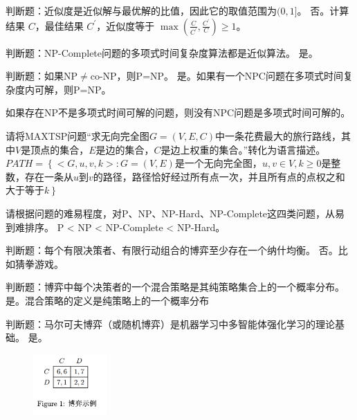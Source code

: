 \begin{problem}
	判断题：近似度是近似解与最优解的比值，因此它的取值范围为$(0,1]$。
	\solution 否。计算结果 $C$，最佳结果 $C^\prime$，近似度等于 $\max(\frac{C}{C^\prime}, \frac{C^\prime}{C}) \ge 1$。
\end{problem}

\begin{problem}
	判断题：NP-Complete问题的多项式时间复杂度算法都是近似算法。
	\solution 是。
\end{problem}

\begin{problem}
	判断题：如果NP$\neq$co-NP，则P=NP。
	\solution 是。如果有一个NPC问题在多项式时间复杂度内可解，则P=NP。

	如果存在NP不是多项式时间可解的问题，则没有NPC问题是多项式时间可解的。
\end{problem}

\begin{problem}
	请将MAXTSP问题“求无向完全图$G=(V,E,C)$中一条花费最大的旅行路线，其中$V$是顶点的集合，$E$是边的集合，$C$是边上权重的集合。”转化为语言描述。
	\solution $PATH=\left\{<G,u,v,k>:G=(V,E)\right.$是一个无向完全图，$u,v\in V,k\ge 0$是整数，存在一条从$u$到$v$的路径，路径恰好经过所有点一次，并且所有点的点权之和大于等于$k\left.\right\}$
\end{problem}

\begin{problem}
	请根据问题的难易程度，对P、NP、NP-Hard、NP-Complete这四类问题，从易到难排序。
	\solution P < NP < NP-Complete < NP-Hard。
\end{problem}

\begin{problem}
	判断题：每个有限决策者、有限行动组合的博弈至少存在一个纳什均衡。
	\solution 否。比如猜拳游戏。
\end{problem}

\begin{problem}
	判断题：博弈中每个决策者的一个混合策略是其纯策略集合上的一个概率分布。
	\solution 是。混合策略的定义是纯策略上的一个概率分布
\end{problem}

\begin{problem}
	判断题：马尔可夫博弈（或随机博弈）是机器学习中多智能体强化学习的理论基础。
	\solution 是。
\end{problem}

\begin{figure}[htbp]
	\centering\label{fig:1}
	\includegraphics[width=0.25\textwidth]{./figure/fig1.png}
\end{figure}

